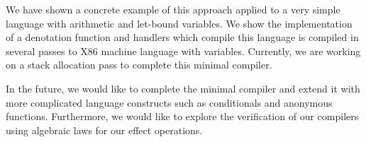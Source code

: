 \documentclass[a4paper,UKenglish,cleveref, autoref, thm-restate, anonymous]{oasics-v2021}
\begin{document}
We have shown a concrete example of this approach applied to a very simple language with arithmetic and let-bound variables.
We show the implementation of a denotation function and handlers which compile this language is compiled in several passes to X86 machine language with variables.
Currently, we are working on a stack allocation pass to complete this minimal compiler.

In the future, we would like to complete the minimal compiler and extend it with more complicated language constructs such as conditionals and anonymous functions.
Furthermore, we would like to explore the verification of our compilers using algebraic laws for our effect operations.




\end{document}
